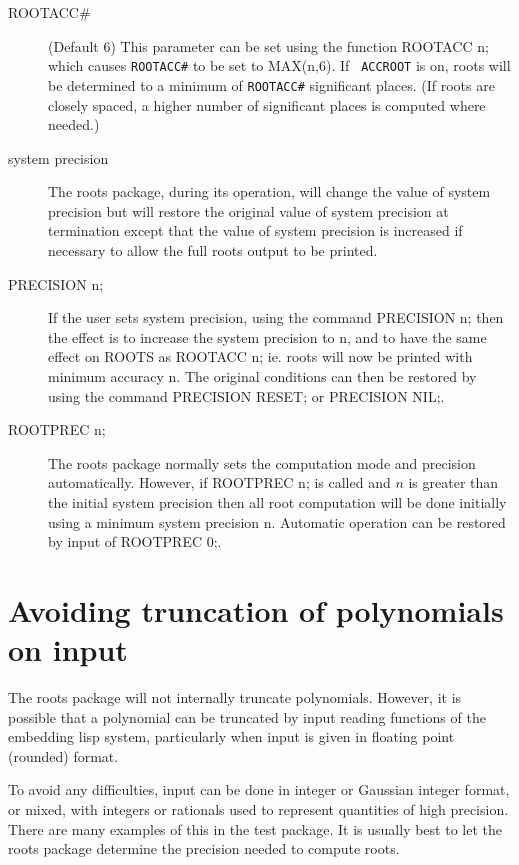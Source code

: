 \begin{description}                 
\item[ROOTACC\#] (Default 6) This parameter can be set using the function
ROOTACC n; which causes {\tt ROOTACC\#} to be set to MAX(n,6).  If {\tt
ACCROOT} is on, roots will be determined to a minimum of {\tt ROOT\-ACC\#}
significant places. (If roots are closely spaced, a higher number of
significant places is computed where needed.)

\item[system precision] The roots package, during its operation, will
change the value of system precision but will restore the original value
of system precision at termination except that the value of system
precision is increased if necessary to allow the full roots output to be
printed.

\item[PRECISION n;] If the user sets system precision, using the command
PRECISION n; then the effect is to increase the system precision to n, and
to have the same effect on ROOTS as ROOTACC n; ie. roots will now be
printed with minimum accuracy n.  The original conditions can then be
restored by using the command PRECISION RESET; or PRECISION NIL;.

\item[ROOTPREC n;] The roots package normally sets the computation mode and
precision automatically.  However, if ROOTPREC n; is
called and $n$ is greater than the initial system precision then all root
computation will be done initially using a minimum system precision n.
Automatic operation can be restored by input of ROOTPREC 0;.
\end{description}


\section{Avoiding truncation of polynomials on input}

The roots package will not internally truncate polynomials.  However, it
is possible that a polynomial can be truncated by input reading functions
of the embedding lisp system, particularly when input is given in floating
point (rounded) format.

To avoid any difficulties, input can be done in integer or Gaussian
integer format, or mixed, with integers or rationals used to represent
quantities of high precision. There are many examples of this in the
test package.  It is usually best to let the roots package
determine the precision needed to compute roots.


